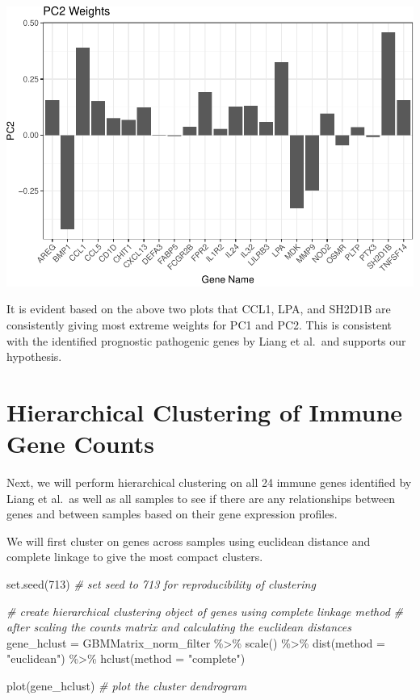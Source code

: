 \documentclass[
]{article}
\newenvironment{Shaded}{\begin{snugshade}}{\end{snugshade}}
\newcommand{\AttributeTok}[1]{\textcolor[rgb]{0.77,0.63,0.00}{#1}}
\newcommand{\CommentTok}[1]{\textcolor[rgb]{0.56,0.35,0.01}{\textit{#1}}}
\newcommand{\DecValTok}[1]{\textcolor[rgb]{0.00,0.00,0.81}{#1}}
\newcommand{\FunctionTok}[1]{\textcolor[rgb]{0.00,0.00,0.00}{#1}}
\newcommand{\NormalTok}[1]{#1}
\newcommand{\OtherTok}[1]{\textcolor[rgb]{0.56,0.35,0.01}{#1}}
\newcommand{\SpecialCharTok}[1]{\textcolor[rgb]{0.00,0.00,0.00}{#1}}
\newcommand{\StringTok}[1]{\textcolor[rgb]{0.31,0.60,0.02}{#1}}
\begin{document}
\includegraphics{LiuKevin_Final_Project_files/figure-latex/unnamed-chunk-13-2.pdf}

It is evident based on the above two plots that CCL1, LPA, and SH2D1B
are consistently giving most extreme weights for PC1 and PC2. This is
consistent with the identified prognostic pathogenic genes by Liang et
al.~and supports our hypothesis.

\newpage

\hypertarget{hierarchical-clustering-of-immune-gene-counts}{%
\section{Hierarchical Clustering of Immune Gene
Counts}\label{hierarchical-clustering-of-immune-gene-counts}}

Next, we will perform hierarchical clustering on all 24 immune genes
identified by Liang et al.~as well as all samples to see if there are
any relationships between genes and between samples based on their gene
expression profiles.

We will first cluster on genes across samples using euclidean distance
and complete linkage to give the most compact clusters.

\begin{Shaded}
\begin{Highlighting}[]
\FunctionTok{set.seed}\NormalTok{(}\DecValTok{713}\NormalTok{) }\CommentTok{\# set seed to 713 for reproducibility of clustering}

\CommentTok{\# create hierarchical clustering object of genes using complete linkage method }
\CommentTok{\# after scaling the counts matrix and calculating the euclidean distances}
\NormalTok{gene\_hclust }\OtherTok{=}\NormalTok{ GBMMatrix\_norm\_filter }\SpecialCharTok{\%\textgreater{}\%} 
  \FunctionTok{scale}\NormalTok{() }\SpecialCharTok{\%\textgreater{}\%} 
  \FunctionTok{dist}\NormalTok{(}\AttributeTok{method =} \StringTok{"euclidean"}\NormalTok{) }\SpecialCharTok{\%\textgreater{}\%} 
  \FunctionTok{hclust}\NormalTok{(}\AttributeTok{method =} \StringTok{"complete"}\NormalTok{)}

\FunctionTok{plot}\NormalTok{(gene\_hclust) }\CommentTok{\# plot the cluster dendrogram}
\end{Highlighting}
\end{Shaded}
\end{document}
